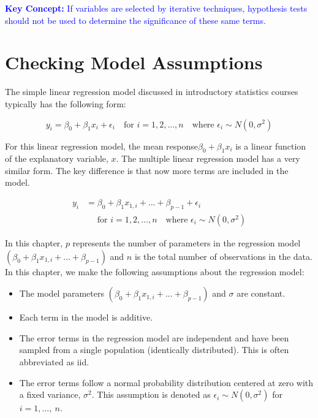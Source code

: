 \documentclass[
]{book}
\providecommand{\tightlist}{%
  \setlength{\itemsep}{0pt}\setlength{\parskip}{0pt}}
\begin{document}
\textbf{\textcolor{blue}{Key Concept:}}
\textcolor{blue}{If variables are selected by iterative techniques, hypothesis tests should not be used to determine the significance of these same terms.}

\hypertarget{checking-model-assumptions}{%
\section{Checking Model Assumptions}\label{checking-model-assumptions}}

The simple linear regression model discussed in introductory statistics courses typically has the following form:

\begin{equation}\label{slr}
y_i = \beta_0 + \beta_1 x_i + \epsilon_i \quad \text{for } i = 1, 2, \dots, n \quad \text{where } \epsilon_i \sim N(0, \sigma^2)
\tag{3.5}
\end{equation}

For this linear regression model, the mean response\(\beta_0 + \beta_1x_i\) is a linear function of the explanatory variable, \(x\). The multiple linear regression model has a very similar form. The key difference is that now more terms are included in the model.

\begin{equation}
\label{mlr}
\begin{split}
y_i &= \beta_0 + \beta_1x_{1,i} + {...} + \beta_{p-1}  + \epsilon_i  \\
    &\quad  \text{   for } i = 1, 2, \dots, n \quad \text{where } \epsilon_i \sim N(0, \sigma^2)
\end{split}
\tag{3.6}
\end{equation}

In this chapter, \(p\) represents the number of parameters in the regression model \((\beta_0 + \beta_1x_{1,i} + {...} + \beta_{p-1})\) and \(n\) is the total number of observations in the data. In this chapter, we make the following assumptions about the regression model:

\begin{itemize}
\tightlist
\item
  The model parameters \((\beta_0 + \beta_1x_{1,i} + {...} + \beta_{p-1})\) and \(\sigma\) are constant.
\item
  Each term in the model is additive.
\item
  The error terms in the regression model are independent and have been sampled from a single population (identically distributed). This is often abbreviated as iid.
\item
  The error terms follow a normal probability distribution centered at zero with a fixed variance, \(\sigma^2\). This assumption is denoted as \(\epsilon_i \sim N(0,\sigma^2)\) for \(i = 1, {...}, ~ n\).
\end{itemize}
\end{document}
